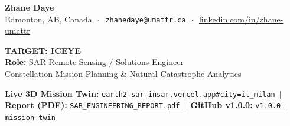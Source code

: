 \documentclass[9pt,letterpaper]{article}
\begin{document}
\begin{tcolorbox}[colframe=iceyeblue,colback=iceyeblue,coltext=white,boxrule=0pt,top=6pt,bottom=6pt]
\begin{minipage}[c]{0.58\textwidth}
    {\Large\textbf{Zhane Daye}} \\[2pt]
    {\footnotesize Edmonton, AB, Canada $\,\cdot\,$ \texttt{zhanedaye@umattr.ca} $\,\cdot\,$ \href{https://www.linkedin.com/in/zhane-umattr}{linkedin.com/in/zhane-umattr}}
\end{minipage}
\hfill
\begin{minipage}[c]{0.40\textwidth}
    \raggedleft
    {\large\textbf{TARGET: ICEYE}}\\[1pt]
    {\footnotesize\textbf{Role:} SAR Remote Sensing / Solutions Engineer}\\[1pt]
    {\scriptsize Constellation Mission Planning \& Natural Catastrophe Analytics}
\end{minipage}
\end{tcolorbox}

\vspace{-4pt}

\begin{tcolorbox}[colframe=bordergray,colback=lightbg,top=3pt,bottom=3pt]
\footnotesize
\textbf{Live 3D Mission Twin:} \href{https://earth2-sar-insar.vercel.app#city=it_milan&preset=sar_focus&stage=v3}{\texttt{earth2-sar-insar.vercel.app\#city=it\_milan}} $\,\vert\,$ 
\textbf{Report (PDF):} \href{https://earth2-sar-insar.vercel.app/reports/EARTH2_X_BAND_SAR_INSAR_ENGINEERING_REPORT.pdf}{\texttt{SAR\_ENGINEERING\_REPORT.pdf}} $\,\vert\,$ 
\textbf{GitHub v1.0.0:} \href{https://github.com/zrt219/earth2studio/releases/tag/v1.0.0-mission-twin}{\texttt{v1.0.0-mission-twin}}
\end{tcolorbox}

\vspace{-4pt}
\end{document}
